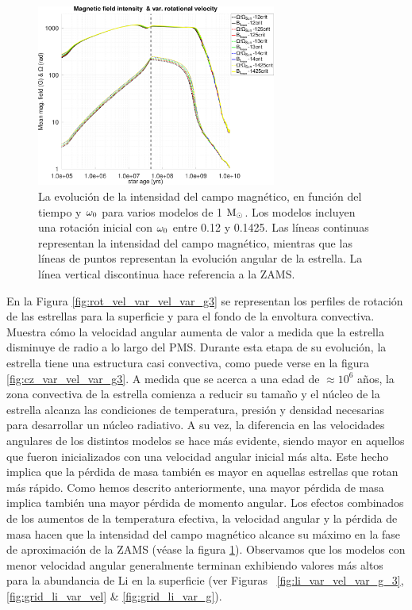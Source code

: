 \begin{figure}
	\centering
	\includegraphics[width=0.7\textwidth]{img/paper2/mag_field_var_vel_g3.pdf}
	\caption{La evolución de la intensidad del campo magnético, en función del tiempo y $\omega_{\mathrm{0}}$ para varios modelos de 1 $\mathrm{M}_\odot$. Los modelos incluyen una rotación inicial con $\omega_{\mathrm{0}}$ entre 0.12 y 0.1425. Las líneas continuas representan la intensidad del campo magnético, mientras que las líneas de puntos representan la evolución angular de la estrella. La línea vertical discontinua hace referencia a la ZAMS.}
	\label{fig:mag_field_var_vel_g3}
\end{figure}

En la Figura \ref{fig:rot_vel_var_vel_var_g3} se representan los perfiles de rotación de las estrellas para la superficie y para el fondo de la envoltura convectiva. Muestra cómo la velocidad angular aumenta de valor a medida que la estrella disminuye de radio a lo largo del PMS. Durante esta etapa de su evolución, la estrella tiene una estructura casi convectiva, como puede verse en la figura \ref{fig:cz_var_vel_var_g3}. A medida que se acerca a una edad de $\approx 10^6$ años, la zona convectiva de la estrella comienza a reducir su tamaño y el núcleo de la estrella alcanza las condiciones de temperatura, presión y densidad necesarias para desarrollar un núcleo radiativo. A su vez, la diferencia en las velocidades angulares de los distintos modelos se hace más evidente, siendo mayor en aquellos que fueron inicializados con una velocidad angular inicial más alta. Este hecho implica que la pérdida de masa también es mayor en aquellas estrellas que rotan más rápido. Como hemos descrito anteriormente, una mayor pérdida de masa implica también una mayor pérdida de momento angular. Los efectos combinados de los aumentos de la temperatura efectiva, la velocidad angular y la pérdida de masa hacen que la intensidad del campo magnético alcance su máximo en la fase de aproximación de la ZAMS (véase la figura \ref{fig:mag_field_var_vel_g3}). Observamos que los modelos con menor velocidad angular generalmente terminan exhibiendo valores más altos para la abundancia de Li en la superficie (ver Figuras~ \ref{fig:li_var_vel_var_g_3}, \ref{fig:grid_li_var_vel} \& \ref{fig:grid_li_var_g}).\par

